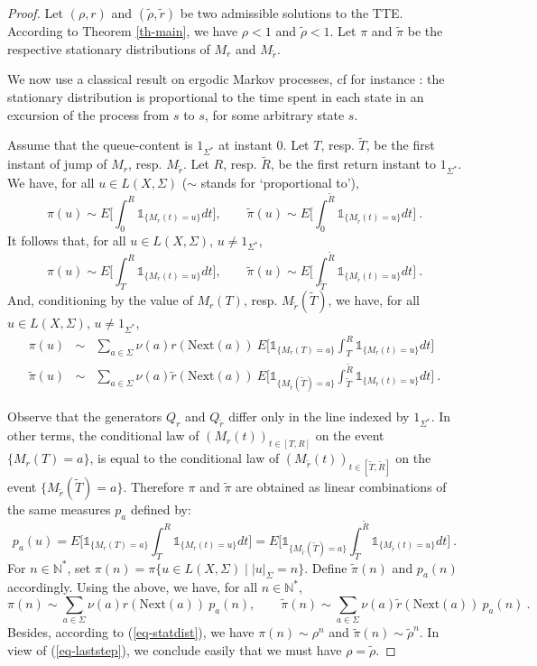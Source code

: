 \documentclass[11pt,a4paper]{article}
\theoremstyle{remark}
\def\Blackboardfont{\mathbb}
\def\rig{\text{Next}}
\def\N{{\Blackboardfont N}}
\def\un{{\mathbb 1}}
\def\eref#1{(\ref{#1})}
\begin{document}
\begin{proof}
Let $(\rho,r)$ and $(\tilde{\rho},\tilde{r})$
be two admissible solutions to the TTE.
According to Theorem
\ref{th-main}, we have $\rho<1$ and $\tilde{\rho}<1$.
Let $\pi$ and $\tilde{\pi}$ be the respective stationary distributions
of $M_r$ and $M_{\tilde{r}}$.

We now use a classical result on
ergodic Markov processes, cf for instance \cite[Chapter
  8, Theorem 5.1]{brem99}: the stationary distribution
is proportional to the time spent in each state in an excursion of the
process from $s$ to $s$, for some arbitrary state $s$.

Assume that the queue-content is $1_{\Sigma^*}$ at instant 0. Let $T$,
resp. $\tilde{T}$, be the first instant of jump of $M_r$,
resp. $M_{\tilde{r}}$.  Let $R$, resp. $\tilde{R}$, be the first
return instant to $1_{\Sigma^*}$.
We have, for all $u \in L(X,\Sigma)$ ($\sim$ stands for
`proportional to'),
\[
\pi(u) \sim E \bigl[ \int_0^R \un_{\{M_r(t)=u\}} dt \bigr], \qquad \tilde{\pi}(u)
\sim E \bigl[ \int_0^{\tilde{R}} \un_{\{M_{\tilde{r}}(t)=u\}} dt \bigr]\:.
\]
It follows that, for all $u \in L(X,\Sigma)$, $u\neq 1_{\Sigma^*}$,
\[
\pi(u) \sim E \bigl[ \int_T^R \un_{\{M_r(t)=u\}} dt \bigr], \qquad \tilde{\pi}(u)
\sim E \bigl[ \int_{\tilde{T}}^{\tilde{R}} \un_{\{M_{\tilde{r}}(t)=u\}} dt \bigr]\:.
\]
And, conditioning by the value of $M_r(T)$,
resp. $M_{\tilde{r}}(\tilde{T})$, we have, for all $u \in
L(X,\Sigma)$, $u\neq 1_{\Sigma^*}$,
\begin{eqnarray*}
\pi(u) & \sim & \sum_{a\in \Sigma} \nu(a)r(\rig(a)) \ E \bigl[
  \un_{\{M_r(T)=a\}} \int_T^R \un_{\{M_r(t)=u\}} dt \bigr] \\
\tilde{\pi}(u)
& \sim & \sum_{a\in \Sigma} \nu(a)\tilde{r}(\rig(a)) \ E \bigl[
  \un_{\{M_{\tilde{r}}(\tilde{T})=a\}}
  \int_{\tilde{T}}^{\tilde{R}} \un_{\{M_{\tilde{r}}(t)=u\}} dt \bigr]\:.
\end{eqnarray*}

Observe that the generators $Q_r$ and $Q_{\tilde{r}}$ differ only in
the line indexed by $1_{\Sigma^*}$. In other terms, the conditional law of $(M_r(t))_{t \in
[T,R]}$ on the event $\{M_r(T)=a\}$, is equal to the conditional law of $(M_{\tilde{r}}(t))_{t \in
[\tilde{T},\tilde{R}]}$ on the event $\{M_{\tilde{r}}(\tilde{T})=a\}$.
Therefore $\pi$ and $\tilde{\pi}$ are obtained as linear combinations
of the same measures $p_a$ defined by:
\[
p_a(u) = E \bigl[
  \un_{\{M_r(T)=a\}} \int_T^R \un_{\{M_r(t)=u\}} dt \bigr] = E \bigl[
  \un_{\{M_{\tilde{r}}(\tilde{T})=a\}}
  \int_{\tilde{T}}^{\tilde{R}} \un_{\{M_{\tilde{r}}(t)=u\}} dt \bigr]
  \:.
\]
For $n\in \N^*$, set $\pi(n)= \pi \{ u \in L(X,\Sigma) \mid
|u|_{\Sigma}=n\}$. Define $\tilde{\pi}(n)$ and $p_a(n)$ accordingly.
Using the above, we have, for all $n\in \N^*$,
\begin{equation}\label{eq-laststep}
\pi(n) \sim \sum_{a\in \Sigma} \nu(a)r(\rig(a)) \ p_a(n), \qquad
\tilde{\pi}(n) \sim \sum_{a\in \Sigma} \nu(a)\tilde{r}(\rig(a)) \
p_a(n) \:.
\end{equation}
Besides, according to \eref{eq-statdist}, we have $\pi(n)\sim
\rho^n$ and $\tilde{\pi}(n)\sim \tilde{\rho}^n$. In view of
\eref{eq-laststep}, we conclude easily that we must have
$\rho=\tilde{\rho}$.


\end{proof}
\end{document}
